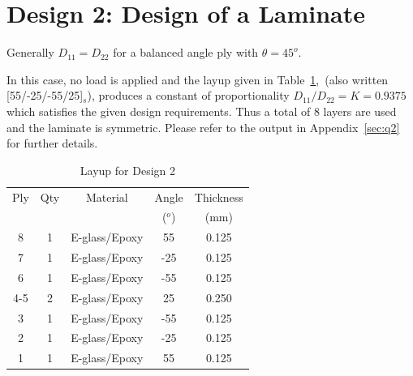 \documentclass{SelimArticle}
\begin{document}
\section{Design 2: Design of a Laminate}
Generally $D_{11} = D_{22}$ for a balanced angle ply with $\theta = 45^{o}$.

In this case, no load is applied and the layup given in Table~\ref{tab:q2},~(also written [55/-25/-55/25]$_{s}$), produces a constant of proportionality $D_{11}/D_{22} = K = 0.9375$ which satisfies the given design requirements. Thus a total of 8 layers are used and the laminate is symmetric. Please refer to the output in Appendix~\ref{sec:q2} for further details.
\begin{table}[H]
\centering
\caption{Layup for Design 2}
\label{tab:q2}
\begin{tabular}{|c|c|c|c|c|}
\hline
Ply & Qty             & Material           & Angle & Thickness \\
& & & ($^{o}$) & (mm) \\
\hline
        8 &          1 & E-glass/Epoxy &         55 &      0.125 \\

        7 &          1 & E-glass/Epoxy &        -25 &      0.125 \\

        6 &          1 & E-glass/Epoxy &        -55 &      0.125 \\

        4-5 &          2 & E-glass/Epoxy &         25 &      0.250 \\

        3 &          1 & E-glass/Epoxy &        -55 &      0.125 \\

        2 &          1 & E-glass/Epoxy &        -25 &      0.125 \\

        1 &          1 & E-glass/Epoxy &         55 &      0.125 \\
\hline
\end{tabular}  
\end{table}  
\end{document}
